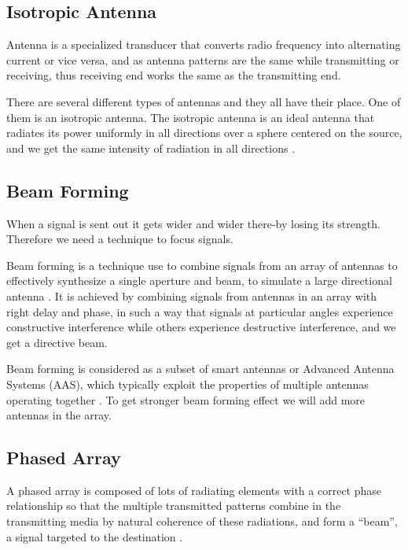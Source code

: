 \subsection{Isotropic Antenna}
Antenna is a specialized transducer that converts radio frequency into alternating current or vice versa, and as antenna patterns are the same while transmitting or receiving, thus receiving end works the same as the transmitting end.

There are several different types of antennas and they all have their place. One of them is an isotropic antenna. The isotropic antenna is an ideal antenna that radiates its power uniformly in all directions over a sphere centered on the source, and we get the same intensity of radiation in all directions \cite{balanis1992antenna}.

\subsection{Beam Forming}

When a signal is sent out it gets wider and wider there-by losing its strength. Therefore we need a technique to focus signals.

Beam forming is a technique use to combine signals from an array of antennas to effectively synthesize a single aperture and beam, to simulate a large directional antenna \cite{van1988beamforming}. It is achieved by combining signals from antennas in an array with right delay and phase, in such a way that signals at particular angles experience constructive interference while others experience destructive interference, and we get a directive beam.

Beam forming is considered as a subset of smart antennas or Advanced Antenna Systems (AAS), which typically exploit the properties of multiple antennas operating together \cite{mouhamadou2006smart}. To get stronger beam forming effect we will add more antennas in the array.

\subsection{Phased Array}

A phased array is composed of lots of radiating elements with a correct phase relationship so that the multiple transmitted patterns combine in the transmitting media by natural coherence of these radiations, and form a “beam”, a signal targeted to the destination \cite{hines1978phased}.

